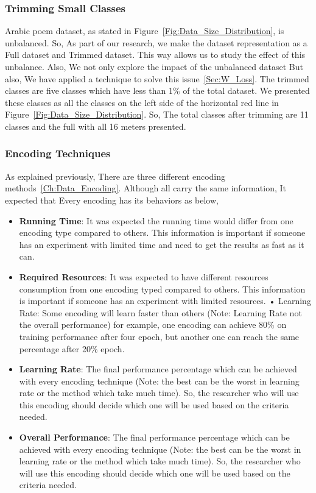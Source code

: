 \subsubsection{Trimming Small Classes}

Arabic poem dataset, as stated in Figure~\ref{Fig:Data_Size_Distribution}, is unbalanced. So, As part of our research, we make the dataset representation as a Full dataset and Trimmed dataset. This way allows us to study the effect of this unbalance. Also, We not only explore the impact of the unbalanced dataset But also, We have applied a technique to solve this issue~\ref{Sec:W_Loss}. The trimmed classes are five classes which have less than 1\% of the total dataset. We presented these classes as all the classes on the left side of the horizontal red line in Figure~\ref{Fig:Data_Size_Distribution}. So, The total classes after trimming are 11 classes and the full with all 16 meters presented.

\subsubsection{Encoding Techniques}

As explained previously, There are three different encoding methods~\ref{Ch:Data_Encoding}. Although all carry the same information, It expected that Every encoding has its behaviors as below,
\begin{itemize}
  \item \textbf{Running Time}: It was expected the running time would differ from one encoding type compared to others. This information is important if someone has an experiment with limited time and need to get the results as fast as it can.
  \item \textbf{Required Resources}: It was expected to have different resources consumption from one encoding typed compared to others. This information is important if someone has an experiment with limited resources.
  • Learning Rate: Some encoding will learn faster than others (Note: Learning Rate not the overall performance) for example, one encoding can achieve 80\% on training performance after four epoch, but another one can reach the same percentage after 20\% epoch.
  \item \textbf{Learning Rate}: The final performance percentage which can be achieved with every encoding technique (Note: the best can be the worst in learning rate or the method which take much time). So, the researcher who will use this encoding should decide which one will be used based on the criteria needed.

  \item \textbf{Overall Performance}: The final performance percentage which can be achieved with every encoding technique (Note: the best can be the worst in learning rate or the method which take much time). So, the researcher who will use this encoding should decide which one will be used based on the criteria needed.

\end{itemize}

